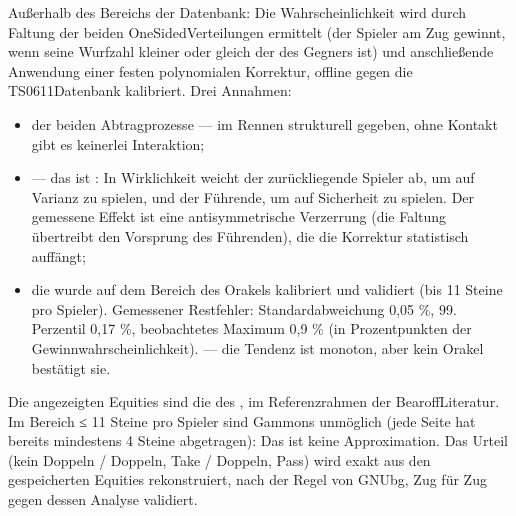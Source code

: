 \documentclass[letterpaper,10pt,german]{sphinxmanual}
\begin{document}
\sphinxAtStartPar
{} Außerhalb des Bereichs der Datenbank: Die Wahrscheinlichkeit wird durch Faltung der beiden One\sphinxhyphen{}Sided\sphinxhyphen{}Verteilungen ermittelt (der Spieler am Zug gewinnt, wenn seine Wurfzahl kleiner oder gleich der des Gegners ist) und anschließende Anwendung einer festen polynomialen Korrektur, offline gegen die TS\sphinxhyphen{}06\sphinxhyphen{}11\sphinxhyphen{}Datenbank kalibriert. Drei Annahmen:
\begin{itemize}
\item {} 
\sphinxAtStartPar
{} der beiden Abtragprozesse — im Rennen strukturell gegeben, ohne Kontakt gibt es keinerlei Interaktion;

\item {} 
\sphinxAtStartPar
{} — das ist : In Wirklichkeit weicht der zurückliegende Spieler ab, um auf Varianz zu spielen, und der Führende, um auf Sicherheit zu spielen. Der gemessene Effekt ist eine antisymmetrische Verzerrung (die Faltung übertreibt den Vorsprung des Führenden), die die Korrektur statistisch auffängt;

\item {} 
\sphinxAtStartPar
die  wurde auf dem Bereich des Orakels kalibriert und validiert (bis 11 Steine pro Spieler). Gemessener Restfehler: Standardabweichung 0,05 \%, 99. Perzentil 0,17 \%, beobachtetes Maximum 0,9 \% (in Prozentpunkten der Gewinnwahrscheinlichkeit).  — die Tendenz ist monoton, aber kein Orakel bestätigt sie.

\end{itemize}

\sphinxAtStartPar
{} Die angezeigten Equities sind die des , im Referenzrahmen der Bearoff\sphinxhyphen{}Literatur. Im Bereich ≤ 11 Steine pro Spieler sind Gammons unmöglich (jede Seite hat bereits mindestens 4 Steine abgetragen): Das ist keine Approximation. Das Urteil (kein Doppeln / Doppeln, Take / Doppeln, Pass) wird exakt aus den gespeicherten Equities rekonstruiert, nach der Regel von GNUbg, Zug für Zug gegen dessen Analyse validiert.
\end{document}

